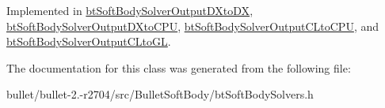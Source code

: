 Implemented in \hyperlink{classbt_soft_body_solver_output_d_xto_d_x_ab1bb3e5dd8a6e45ad6063398682806cb}{bt\+Soft\+Body\+Solver\+Output\+D\+Xto\+D\+X}, \hyperlink{classbt_soft_body_solver_output_d_xto_c_p_u_a0106bf90eec43326254607cab4a10478}{bt\+Soft\+Body\+Solver\+Output\+D\+Xto\+C\+P\+U}, \hyperlink{classbt_soft_body_solver_output_c_lto_c_p_u_a2ab37dd740cd08217468e4b9e74d73f5}{bt\+Soft\+Body\+Solver\+Output\+C\+Lto\+C\+P\+U}, and \hyperlink{classbt_soft_body_solver_output_c_lto_g_l_ab6f232898b815166551373a6c2d95b58}{bt\+Soft\+Body\+Solver\+Output\+C\+Lto\+G\+L}.



The documentation for this class was generated from the following file\+:\begin{DoxyCompactItemize}
\item 
bullet/bullet-\/2.-\/r2704/src/\+Bullet\+Soft\+Body/bt\+Soft\+Body\+Solvers.\+h\end{DoxyCompactItemize}
